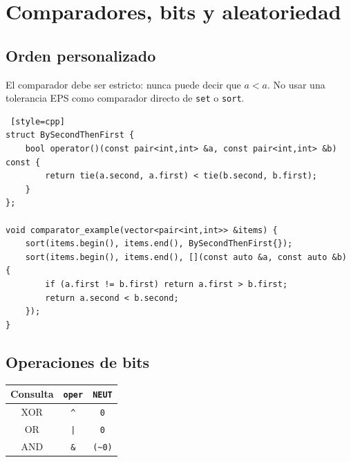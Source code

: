 \section{Comparadores, bits y aleatoriedad}

\subsection{Orden personalizado}

El comparador debe ser estricto: nunca puede decir que $a<a$. No usar una
tolerancia EPS como comparador directo de \texttt{set} o \texttt{sort}.

\begin{lstlisting} [style=cpp]
struct BySecondThenFirst {
    bool operator()(const pair<int,int> &a, const pair<int,int> &b) const {
        return tie(a.second, a.first) < tie(b.second, b.first);
    }
};

void comparator_example(vector<pair<int,int>> &items) {
    sort(items.begin(), items.end(), BySecondThenFirst{});
    sort(items.begin(), items.end(), [](const auto &a, const auto &b) {
        if (a.first != b.first) return a.first > b.first;
        return a.second < b.second;
    });
}
\end{lstlisting}

\subsection{Operaciones de bits}

\begin{center}
\begin{tabular}{|c|c|c|}
\hline
Consulta & \texttt{oper} & \texttt{NEUT} \\
\hline
XOR & \texttt{\^} & \texttt{0} \\
OR & \texttt{|} & \texttt{0} \\
AND & \texttt{\&} & \texttt{(\textasciitilde 0)} \\
\hline
\end{tabular}
\end{center}

